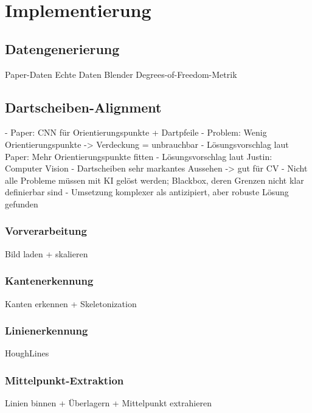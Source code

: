 \section{Implementierung}

\subsection{Datengenerierung}

Paper-Daten
Echte Daten
Blender
Degrees-of-Freedom-Metrik


\subsection{Dartscheiben-Alignment}

- Paper: CNN für Orientierungspunkte + Dartpfeile
- Problem: Wenig Orientierungspunkte -> Verdeckung = unbrauchbar
- Lösungsvorschlag laut Paper: Mehr Orientierungspunkte fitten
- Lösungsvorschlag laut Justin: Computer Vision
- Dartscheiben sehr markantes Aussehen -> gut für CV
- Nicht alle Probleme müssen mit KI gelöst werden; Blackbox, deren Grenzen nicht klar definierbar sind
- Umsetzung komplexer als antizipiert, aber robuste Lösung gefunden

\subsubsection{Vorverarbeitung}
Bild laden + skalieren

\subsubsection{Kantenerkennung}
Kanten erkennen + Skeletonization

\subsubsection{Linienerkennung}
HoughLines

\subsubsection{Mittelpunkt-Extraktion}
Linien binnen + Überlagern + Mittelpunkt extrahieren

